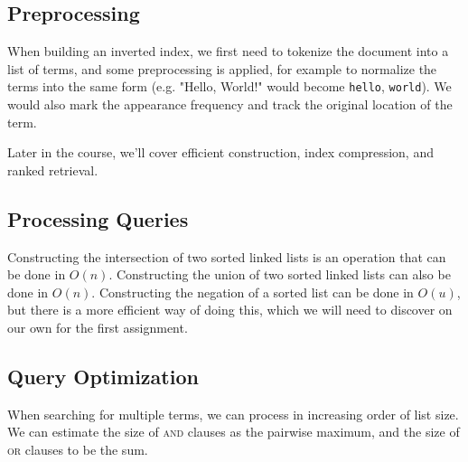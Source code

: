 \documentclass{idc_msc}
\begin{document}
\subsection{Preprocessing}

When building an inverted index, we first need to tokenize the document into a list of terms, and some preprocessing is applied, for example to normalize the terms into the same form (e.g. "Hello, World!" would become \texttt{hello}, \texttt{world}).
We would also mark the appearance frequency and track the original location of the term.

Later in the course, we'll cover efficient construction, index compression, and ranked retrieval.

\subsection{Processing Queries}

Constructing the intersection of two sorted linked lists is an operation that can be done in \(O(n)\).
Constructing the union of two sorted linked lists can also be done in \(O(n)\).
Constructing the negation of a sorted list can be done in \(O(u)\), but there is a more efficient way of doing this, which we will need to discover on our own for the first assignment.

\subsection{Query Optimization}

When searching for multiple terms, we can process in increasing order of list size.
We can estimate the size of \textsc{and} clauses as the pairwise maximum, and the size of \textsc{or} clauses to be the sum.
\end{document}
